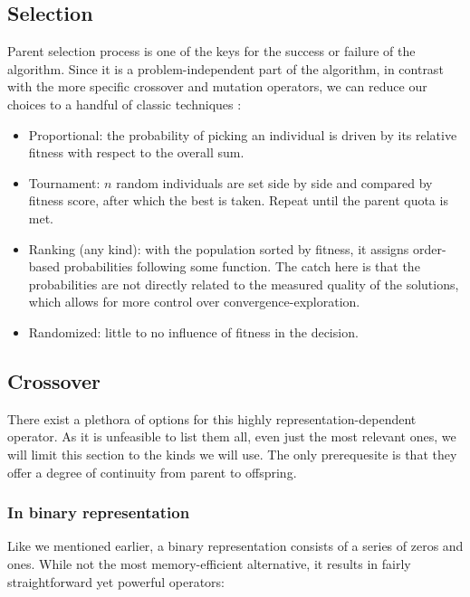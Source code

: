 	\subsection{Selection}

		Parent selection process is one of the keys for the success or failure of the algorithm. Since it is a problem-independent part of the algorithm, in contrast with the more specific crossover and mutation operators, we can reduce our choices to a handful of classic techniques \cite{selection-ga}:

		\begin{itemize}

			\item
			Proportional: the probability of picking an individual is driven by its relative fitness with respect to the overall sum.

			\item
			Tournament: $n$ random individuals are set side by side and compared by fitness score, after which the best is taken. Repeat until the parent quota is met.

			\item
			Ranking (any kind): with the population sorted by fitness, it assigns order-based probabilities following some function. The catch here is that the probabilities are not directly related to the measured quality of the solutions, which allows for more control over convergence-exploration.

			\item
			Randomized: little to no influence of fitness in the decision.

		\end{itemize}

	\subsection{Crossover}

		There exist a plethora of options for this highly representation-dependent operator. As it is unfeasible to list them all, even just the most relevant ones, we will limit this section to the kinds we will use. The only prerequesite is that they offer a degree of continuity from parent to offspring.

		\subsubsection{In binary representation}

			Like we mentioned earlier, a binary representation consists of a series of zeros and ones. While not the most memory-efficient alternative, it results in fairly straightforward yet powerful operators:


